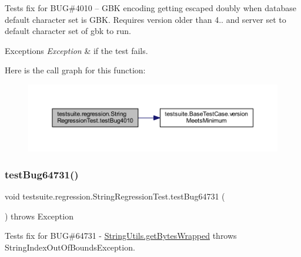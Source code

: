 Tests fix for B\+UG\#4010 -- G\+BK encoding getting escaped doubly when database default character set is G\+BK. Requires version older than 4.. and server set to default character set of \textquotesingle{}gbk\textquotesingle{} to run.


\begin{DoxyExceptions}{Exceptions}
{\em Exception} & if the test fails. \\
\hline
\end{DoxyExceptions}
Here is the call graph for this function\+:
\nopagebreak
\begin{figure}[H]
\begin{center}
\leavevmode
\includegraphics[width=350pt]{classtestsuite_1_1regression_1_1_string_regression_test_aab8671e0e1b8917318be7da4af2acfd5_cgraph}
\end{center}
\end{figure}
\mbox{\label{classtestsuite_1_1regression_1_1_string_regression_test_a7e24a2a41964d76d3b5b82b5a064d820}} 
\subsubsection{\texorpdfstring{test\+Bug64731()}{testBug64731()}}
{\footnotesize\ttfamily void testsuite.\+regression.\+String\+Regression\+Test.\+test\+Bug64731 (\begin{DoxyParamCaption}{ }\end{DoxyParamCaption}) throws Exception}

Tests fix for B\+UG\#64731 -\/ \mbox{\hyperlink{classcom_1_1mysql_1_1jdbc_1_1_string_utils_afd812ec650baa8ee5d9218e48ec7e026}{String\+Utils.\+get\+Bytes\+Wrapped}} throws String\+Index\+Out\+Of\+Bounds\+Exception.


